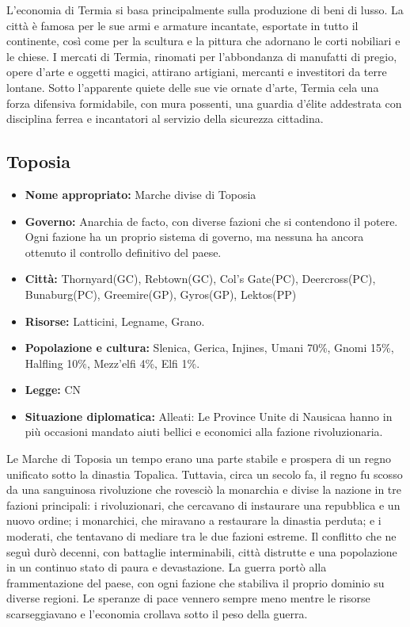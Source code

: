 \documentclass[10pt, a4paper]{report}
\begin{document}
\begin{multicols}{2}
L'economia di Termia si basa principalmente sulla produzione di beni di lusso. La città è famosa per le sue armi e armature incantate, esportate in tutto il continente, così come per la scultura e la pittura che adornano le corti nobiliari e le chiese. I mercati di Termia, rinomati per l'abbondanza di manufatti di pregio, opere d'arte e oggetti magici, attirano artigiani, mercanti e investitori da terre lontane.
Sotto l’apparente quiete delle sue vie ornate d’arte, Termia cela una forza difensiva formidabile, con mura possenti, una guardia d'élite addestrata con disciplina ferrea e incantatori al servizio della sicurezza cittadina.

\subsection*{Toposia}
\begin{itemize}
	\item \textbf{Nome appropriato:} Marche divise di Toposia
	\item \textbf{Governo:} Anarchia de facto, con diverse fazioni che si contendono il potere. Ogni fazione ha un proprio sistema di governo, ma nessuna ha ancora ottenuto il controllo definitivo del paese.
	\item \textbf{Città:} Thornyard(GC), Rebtown(GC), Col's Gate(PC), Deercross(PC), Bunaburg(PC), Greemire(GP), Gyros(GP), Lektos(PP)
	\item \textbf{Risorse:} Latticini, Legname, Grano.
	\item \textbf{Popolazione e cultura:} Slenica, Gerica, Injines, Umani 70\%, Gnomi 15\%, Halfling 10\%, Mezz'elfi 4\%, Elfi 1\%.
	\item \textbf{Legge:} CN
	\item \textbf{Situazione diplomatica:} Alleati: Le Province Unite di Nausicaa hanno in più occasioni mandato aiuti bellici e economici alla fazione rivoluzionaria.
\end{itemize}
Le Marche di Toposia un tempo erano una parte stabile e prospera di un regno unificato sotto la dinastia Topalica. Tuttavia, circa un secolo fa, il regno fu scosso da una sanguinosa rivoluzione che rovesciò la monarchia e divise la nazione in tre fazioni principali: i rivoluzionari, che cercavano di instaurare una repubblica e un nuovo ordine; i monarchici, che miravano a restaurare la dinastia perduta; e i moderati, che tentavano di mediare tra le due fazioni estreme. Il conflitto che ne seguì durò decenni, con battaglie interminabili, città distrutte e una popolazione in un continuo stato di paura e devastazione. La guerra portò alla frammentazione del paese, con ogni fazione che stabiliva il proprio dominio su diverse regioni. Le speranze di pace vennero sempre meno mentre le risorse scarseggiavano e l'economia crollava sotto il peso della guerra.

\end{multicols}
\end{document}

